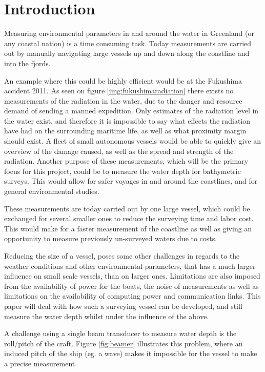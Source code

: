 \chapter{Introduction}
Measuring environmental parameters in and around the water in Greenland (or any coastal nation) is a time consuming task. Today measurements are carried out by manually navigating large vessels up and down along the coastline and into the fjords. 

An example where this could be highly efficient would be at the Fukushima accident 2011. As seen on figure \ref{img:fukushimaradiation} there exists no measurements of the radiation in the water, due to the danger and resource demand of sending a manned expedition. Only estimates of the radiation level in the water exist, and therefore it is impossible to say what effects the radiation have had on the surrounding maritime life, as well as what proximity margin should exist. A fleet of small autonomous vessels would be able to quickly give an overview of the damage caused, as well as the spread and strength of the radiation.
Another purpose of these measurements, which will be the primary focus for this project, could be to measure the water depth for bathymetric surveys. This would allow for safer voyages in and around the coastlines, and for general environmental studies. 

These measurements are today carried out by one large vessel, which could be exchanged for several smaller ones to reduce the surveying time and labor cost. This would make for a faster measurement of the coastline as well as giving an opportunity to measure previously un-surveyed waters due to costs. 

Reducing the size of a vessel, poses some other challenges in regards to the weather conditions and other environmental parameters, that has a much larger influence on small scale vessels, than on larger ones.
Limitations are also imposed from the availability of power for the boats,  the noise of measurements as well as limitations on the availability of computing power and communication links. This paper will deal with how such a surveying vessel can be developed, and still measure the water depth whilst under the influence of the above.

A challenge using a single beam transducer to measure water depth is the roll/pitch of the craft. Figure \vref{fig:beamer} illustrates this problem, where an induced pitch of the ship (eg. a wave) makes it impossible for the vessel to make a precise measurement.

